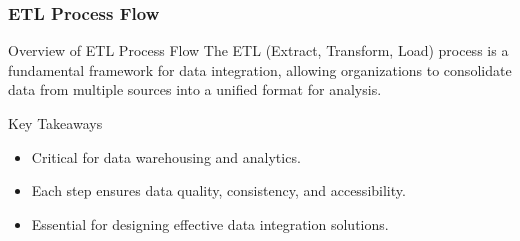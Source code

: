 \documentclass[aspectratio=169]{beamer}
\begin{document}
\begin{frame}[fragile]
    \frametitle{ETL Process Flow}
    \begin{block}{Overview of ETL Process Flow}
        The ETL (Extract, Transform, Load) process is a fundamental framework for data integration, allowing organizations to consolidate data from multiple sources into a unified format for analysis. 
    \end{block}
    \begin{block}{Key Takeaways}
        \begin{itemize}
            \item Critical for data warehousing and analytics.
            \item Each step ensures data quality, consistency, and accessibility.
            \item Essential for designing effective data integration solutions.
        \end{itemize}
    \end{block}
\end{frame}
\end{document}
